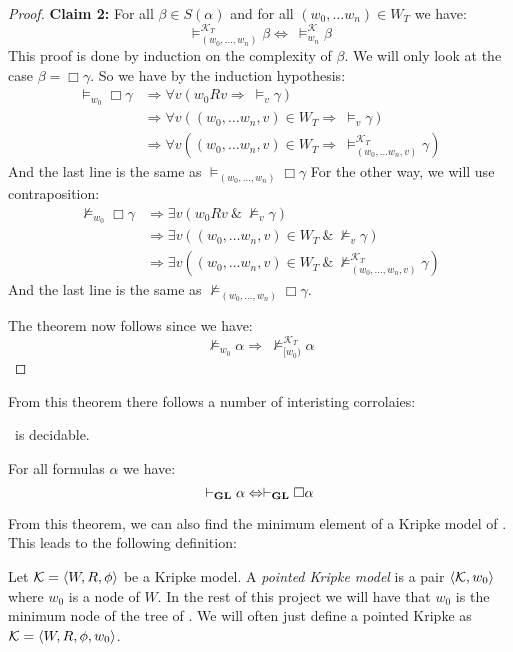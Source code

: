 \documentclass[../main.tex]{subfiles}
\begin{document}
\begin{proof}
	\textbf{Claim 2:} For all $\beta\in S(\alpha)$ and for all $(w_0,\ldots
	w_n)\in W_T$ we have:
	$$\vDash^{\mathcal{K}_T}_{(w_0,\ldots,w_n)}\beta\Leftrightarrow\ \vDash_{w_n}^\mathcal{K}\beta$$
	This proof is done by induction on the complexity of $\beta$. We will
	only look at the case $\beta=\Box\gamma$. So we have by the induction
	hypothesis:
	\begin{align*}
		\vDash_{w_0}\Box\gamma&\Rightarrow\forall v(w_0Rv\Rightarrow\ 
		\vDash_v\gamma)\\
				      &\Rightarrow\forall v((w_0,\ldots
				      w_n,v)\in W_T\Rightarrow\
				      \vDash_v\gamma)\\
				      &\Rightarrow\forall v((w_0,\ldots
				      w_n,v)\in W_T\Rightarrow\
				      \vDash_{(w_0,\ldots w_n,v)}^{\mathcal{K}_T}\gamma)
	\end{align*}
	And the last line is the same as $\vDash_{(w_0,\ldots,w_n)}\Box\gamma$
	For the other way, we will use contraposition:
	\begin{align*}
		\not\vDash_{w_0}\Box\gamma&\Rightarrow \exists v(w_0Rv\ \&\
		\not\vDash_v\gamma)\\
					  &\Rightarrow\exists v((w_0,\ldots
					  w_n,v)\in W_T\ \&\
					  \not\vDash_v\gamma)\\
					  &\Rightarrow\exists v((w_0,\ldots
					  w_n,v)\in W_T\ \&\
					  \not\vDash_{(w_0,\ldots,w_n,v)}^{\mathcal{K}_T}\gamma)
	\end{align*}
	And the last line is the same as
	$\not\vDash_{(w_0,\ldots,w_n)}\Box\gamma$. 

	The theorem now follows since we have:
	$$\not\vDash_{w_0}\alpha\Rightarrow\
	\not\vDash_{[w_0)}^{\mathcal{K}_T}\alpha$$
\end{proof}

From this theorem there follows a number of interisting corrolaies:

\begin{cor}
	\GL\ is decidable.
\end{cor}
\begin{cor}
	For all formulas $\alpha$ we have:
	\[\vdash_{\text{\textbf{GL}}}\alpha\Leftrightarrow\vdash_{\text{\textbf{GL}}}\Box\alpha\]
\end{cor}

From this theorem, we can also find the minimum element of a Kripke model of
\GL. This leads to the following definition:

\begin{defi}
	Let $\mathcal{K}=\langle W,R,\phi\rangle$ be a Kripke model. A \textit{pointed
	Kripke model} is a pair $\langle \mathcal{K},w_0\rangle$ where $w_0$ is a node
	of $W$. In the rest of this project we will have that $w_0$ is the
	minimum node of the tree of \GL. We will often just define a pointed
	Kripke as $\mathcal{K}=\langle W,R,\phi,w_0\rangle$.
\end{defi}
\end{document}
